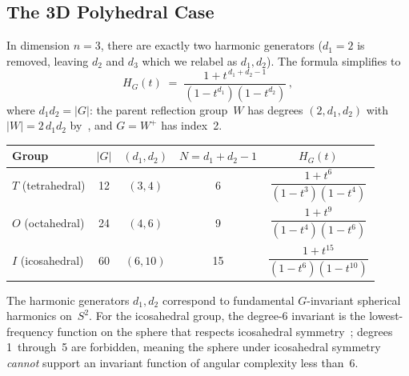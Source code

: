 \documentclass[11pt,letterpaper]{article}
\theoremstyle{definition}
\newcommand{\abs}[1]{\lvert #1 \rvert}
\begin{document}
\subsection{The 3D Polyhedral Case}
In dimension $n=3$, there are exactly two harmonic generators ($d_1=2$ is removed, leaving $d_2$ and $d_3$ which we relabel as $d_1,d_2$).  The formula simplifies to
\begin{equation}\label{eq:molien3d}
  H_G(t) \;=\; \frac{1+t^{\,d_1+d_2-1}}{(1-t^{d_1})(1-t^{d_2})}\,,
\end{equation}
where $d_1 d_2=\abs{G}$: the parent reflection group~$W$ has degrees $(2,d_1,d_2)$ with $\abs{W}=2\,d_1 d_2$ by~\cite{CST54}, and $G=W^+$ has index~2.
\medskip
\begin{center}
\begin{tabular}{lcccc}
\toprule
Group & $\abs{G}$ & $(d_1,d_2)$ & $N=d_1+d_2-1$ & $H_G(t)$ \\
\midrule
$T$ (tetrahedral)  & 12 & $(3,4)$  & 6  & $\dfrac{1+t^6}{(1-t^3)(1-t^4)}$ \\[10pt]
$O$ (octahedral)   & 24 & $(4,6)$  & 9  & $\dfrac{1+t^9}{(1-t^4)(1-t^6)}$ \\[10pt]
$I$ (icosahedral)  & 60 & $(6,10)$ & 15 & $\dfrac{1+t^{15}}{(1-t^6)(1-t^{10})}$ \\
\bottomrule
\end{tabular}
\end{center}
The harmonic generators $d_1,d_2$ correspond to fundamental $G$-invariant spherical harmonics on~$S^2$.  For the icosahedral group, the degree-6 invariant is the lowest-frequency function on the sphere that respects icosahedral symmetry~\cite{Poole1932}; degrees 1~through~5 are forbidden, meaning the sphere under icosahedral symmetry \emph{cannot} support an invariant function of angular complexity less than~6.
\end{document}
